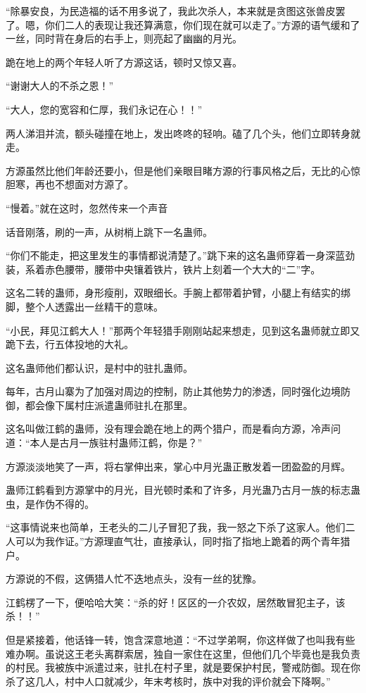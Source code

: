 \begin{this_body}
“除暴安良，为民造福的话不用多说了，我此次杀人，本来就是贪图这张兽皮罢了。嗯，你们二人的表现让我还算满意，你们现在就可以走了。”方源的语气缓和了一丝，同时背在身后的右手上，则亮起了幽幽的月光。

跪在地上的两个年轻人听了方源这话，顿时又惊又喜。

“谢谢大人的不杀之恩！”

“大人，您的宽容和仁厚，我们永记在心！！”

两人涕泪并流，额头碰撞在地上，发出咚咚的轻响。磕了几个头，他们立即转身就走。

方源虽然比他们年龄还要小，但是他们亲眼目睹方源的行事风格之后，无比的心惊胆寒，再也不想面对方源了。

“慢着。”就在这时，忽然传来一个声音

话音刚落，刷的一声，从树梢上跳下一名蛊师。

“你们不能走，把这里发生的事情都说清楚了。”跳下来的这名蛊师穿着一身深蓝劲装，系着赤色腰带，腰带中央镶着铁片，铁片上刻着一个大大的“二”字。

这名二转的蛊师，身形瘦削，双眼细长。手腕上都带着护臂，小腿上有结实的绑脚，整个人透露出一丝精干的意味。

“小民，拜见江鹤大人！”那两个年轻猎手刚刚站起来想走，见到这名蛊师就立即又跪下去，行五体投地的大礼。

这名蛊师他们都认识，是村中的驻扎蛊师。

每年，古月山寨为了加强对周边的控制，防止其他势力的渗透，同时强化边境防御，都会像下属村庄派遣蛊师驻扎在那里。

这名叫做江鹤的蛊师，没有理会跪在地上的两个猎户，而是看向方源，冷声问道：“本人是古月一族驻村蛊师江鹤，你是？”

方源淡淡地笑了一声，将右掌伸出来，掌心中月光蛊正散发着一团盈盈的月辉。

蛊师江鹤看到方源掌中的月光，目光顿时柔和了许多，月光蛊乃古月一族的标志蛊虫，是作伪不得的。

“这事情说来也简单，王老头的二儿子冒犯了我，我一怒之下杀了这家人。他们二人可以为我作证。”方源理直气壮，直接承认，同时指了指地上跪着的两个青年猎户。

方源说的不假，这俩猎人忙不迭地点头，没有一丝的犹豫。

江鹤楞了一下，便哈哈大笑：“杀的好！区区的一介农奴，居然敢冒犯主子，该杀！！”

但是紧接着，他话锋一转，饱含深意地道：“不过学弟啊，你这样做了也叫我有些难办啊。虽说这王老头离群索居，独自一家住在这里，但他们几个毕竟也是我负责的村民。我被族中派遣过来，驻扎在村子里，就是要保护村民，警戒防御。现在你杀了这几人，村中人口就减少，年末考核时，族中对我的评价就会下降啊。”


\end{this_body}
